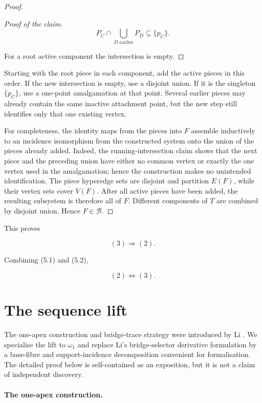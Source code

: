 \documentclass[a4paper,11pt,reqno]{amsart}
\theoremstyle{plain}
\theoremstyle{definition}
\theoremstyle{remark}
\begin{document}
\begin{proof}
\begin{proof}[Proof of the claim]
\[
P_C\cap\bigcup_{D\text{ earlier}}P_D\subseteq\{p_C\}.
\]

For a root active component the intersection is empty.
\end{proof}

Starting with the root piece in each component, add the active pieces in this
order. If the new intersection is empty, use a disjoint union. If it is the
singleton \(\{p_C\}\), use a one-point amalgamation at that point. Several
earlier pieces may already contain the same inactive attachment point, but
the new step still identifies only that one existing vertex.

For completeness, the identity maps from the pieces into \(F\) assemble
inductively to an incidence isomorphism from the constructed system onto the
union of the pieces already added. Indeed, the running-intersection claim
shows that the next piece and the preceding union have either no common
vertex or exactly the one vertex used in the amalgamation; hence the
construction makes no unintended identification. The piece hyperedge sets
are disjoint and partition \(E(F)\), while their vertex sets cover \(V(F)\).
After all active pieces have been added, the resulting subsystem is therefore
all of \(F\). Different components of \(T\) are combined by disjoint union.
Hence \(F\in\mathcal B\).
\end{proof}

This proves

\[
(3)\Longrightarrow(2). \tag{5.2}
\]

Combining (5.1) and (5.2),

\[
(2)\Longleftrightarrow(3). \tag{5.3}
\]

\section{The sequence lift}\label{the-sequence-lift-used-in-the-avoidance-constructions}

The one-apex construction and bridge-trace strategy were introduced by Li
\citep[Sections~3--4 and Theorem~4.6]{li2026}.  We specialise the lift to
$\omega_1$ and replace Li's bridge-selector derivative formulation by a
base-fibre and support-incidence decomposition convenient for formalisation.
The detailed proof below is self-contained as an exposition, but it is not a
claim of independent discovery.

\paragraph{The one-apex construction.}\label{the-one-apex-construction}
\end{document}
